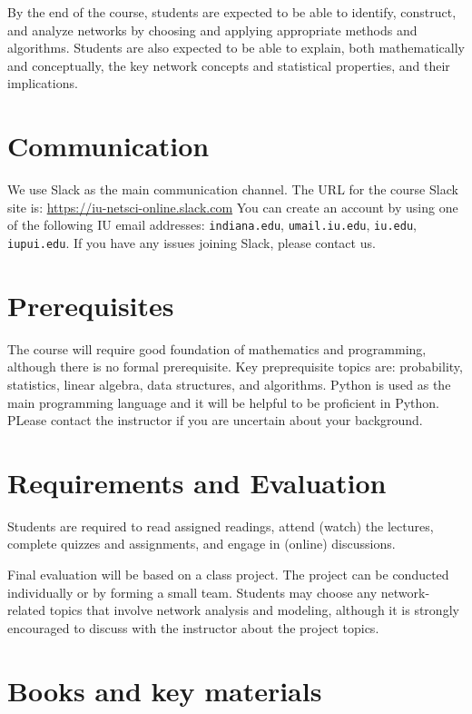 \documentclass[11pt,article,oneside]{memoir} %
\begin{document}
By the end of the course, students are expected to be able to identify,
construct, and analyze networks by choosing and applying appropriate methods
and algorithms. Students are also expected to be able to explain, both
mathematically and conceptually, the key network concepts and statistical
properties, and their implications. 
\section{Communication} %

We use Slack as the main communication channel. The URL for the course Slack
site is: \url{https://iu-netsci-online.slack.com} You can create an account by
using one of the following IU email addresses: \texttt{indiana.edu},
\texttt{umail.iu.edu}, \texttt{iu.edu}, \texttt{iupui.edu}. If you have any
issues joining Slack, please contact us. 

\section{Prerequisites} %

The course will require good foundation of mathematics and programming,
although there is no formal prerequisite. Key preprequisite topics are:
probability, statistics, linear algebra, data structures, and algorithms.
Python is used as the main programming language and it will be helpful to be
proficient in Python. PLease contact the instructor if you are uncertain about
your background.

\section{Requirements and Evaluation} %

Students are required to read assigned readings, attend (watch) the lectures,
complete quizzes and assignments, and engage in (online) discussions. 

Final evaluation will be based on a class project. The project can be conducted
individually or by forming a small team. Students may choose any
network-related topics that involve network analysis and modeling, although it
is strongly encouraged to discuss with the instructor about the project topics. 

\section{Books and key materials} %
\end{document}
